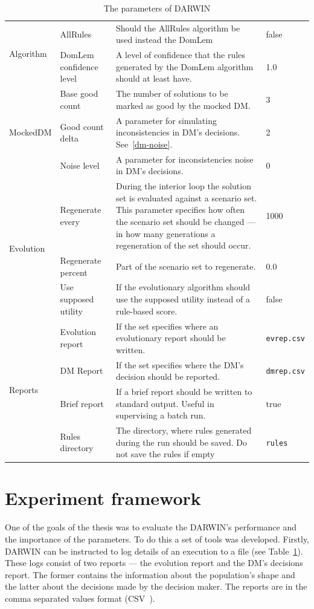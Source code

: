\begin{table}
\begin{tabular}{l l p{7cm} l}
    \hline 
    \multirow{2}{*}{Algorithm} & AllRules & Should the AllRules algorithm be
    used instead the  DomLem& false \\
    & DomLem confidence level & A level of
    confidence that the rules generated by the
    DomLem algorithm should at least have. & 1.0 \\
    \hline
    \multirow{3}{*}{MockedDM} & Base good count & The number of solutions to be marked
    as good by the mocked DM. & 3 \\
    & Good count delta & A parameter for simulating inconsistencies in DM's decisions. See~\ref{dm-noise}. & 2 \\
    & Noise level & A parameter for inconsistencies noise in DM's decisions. & 0 \\
    \hline
    \multirow{3}{*}{Evolution} & Regenerate every & During the interior loop
    the solution set is evaluated against a scenario set. This parameter
    specifies how often the scenario set should be changed --- in how many
    generations a regeneration of the set should occur. & 1000 \\
    & Regenerate percent & Part of the scenario set to regenerate. & 0.0 \\
    & Use supposed utility & If the evolutionary algorithm should use the
    supposed utility instead of a rule-based score. & false \\
    \hline
    \multirow{4}{*}{Reports} & Evolution report & If the set specifies where an
    evolutionary report should be written.  & \texttt{evrep.csv} \\
    & DM Report & If the set specifies where the DM's decision should be reported. & \texttt{dmrep.csv} \\
    &  Brief report & If a brief report should be written to standard
    output. Useful in supervising a batch run. & true \\
    & Rules directory & The directory, where rules generated during the run
    should be saved. Do not save the rules if empty & \texttt{rules} \\
    \hline
  \end{tabular}
  \caption{The parameters of DARWIN}
  \label{t:params}
\end{table}


\section{Experiment framework}
One of the goals of the thesis was to evaluate the DARWIN's performance and
the importance of the parameters. To do this a set of tools was
developed. Firstly, DARWIN can be instructed to log details of an execution to
a file (see Table~\ref{t:params}). These logs consist of two reports --- the
evolution report and the DM's decisions report. The former contains the
information about the population's shape and the latter about the decisions
made by the decision maker. The reports are in the comma separated values
format (CSV~\cite{RFC4180}).

